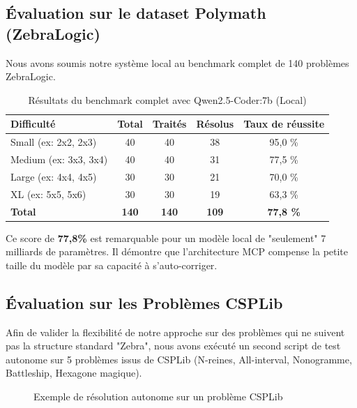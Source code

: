 \documentclass[12pt,a4paper]{article}
\begin{document}
\subsection{Évaluation sur le dataset Polymath (ZebraLogic)}
Nous avons soumis notre système local au benchmark complet de 140 problèmes ZebraLogic.

\begin{table}[h]
\centering
\begin{tabular}{|l|c|c|c|c|}
\hline
\textbf{Difficulté} & \textbf{Total} & \textbf{Traités} & \textbf{Résolus} & \textbf{Taux de réussite} \\
\hline
Small (ex: 2x2, 2x3) & 40 & 40 & 38 & 95,0 \% \\
Medium (ex: 3x3, 3x4) & 40 & 40 & 31 & 77,5 \% \\
Large (ex: 4x4, 4x5) & 30 & 30 & 21 & 70,0 \% \\
XL (ex: 5x5, 5x6) & 30 & 30 & 19 & 63,3 \% \\
\hline
\textbf{Total} & \textbf{140} & \textbf{140} & \textbf{109} & \textbf{77,8 \%} \\
\hline
\end{tabular}
\caption{Résultats du benchmark complet avec Qwen2.5-Coder:7b (Local)}
\label{tab:benchmark_polymath}
\end{table}

Ce score de \textbf{77,8\%} est remarquable pour un modèle local de "seulement" 7 milliards de paramètres. Il démontre que l'architecture MCP compense la petite taille du modèle par sa capacité à s'auto-corriger.

\subsection{Évaluation sur les Problèmes CSPLib}
Afin de valider la flexibilité de notre approche sur des problèmes qui ne suivent pas la structure standard "Zebra", nous avons exécuté un second script de test autonome sur 5 problèmes issus de CSPLib (N-reines, All-interval, Nonogramme, Battleship, Hexagone magique).

\begin{figure}[H]
    \centering
    \vspace{4cm} %
    \caption{Exemple de résolution autonome sur un problème CSPLib}
    \label{fig:csplib}
\end{figure}
\end{document}
